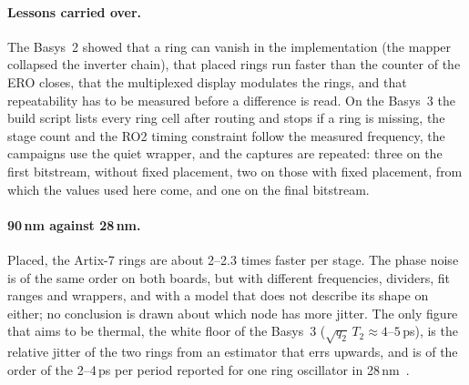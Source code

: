 \paragraph{Lessons carried over.} The Basys~2 showed that a ring can vanish
in the implementation (the mapper collapsed the inverter chain), that
placed rings run faster than the counter of the \ac{ERO} closes, that the
multiplexed display modulates the rings, and that repeatability has to be
measured before a difference is read. On the Basys~3 the build script lists
every ring cell after routing and stops if a ring is missing, the stage
count and the RO2 timing constraint follow the measured frequency, the
campaigns use the quiet wrapper, and the captures are repeated: three on
the first bitstream, without fixed placement, two on those with fixed
placement, from which the values used here come, and one on the final
bitstream.

\paragraph{90\,nm against 28\,nm.} Placed, the Artix-7 rings are about
2--2.3 times faster per stage. The phase noise is of the same order on
both boards, but with different frequencies, dividers, fit ranges and
wrappers, and with a model that does not describe its shape on either; no
conclusion is drawn about which node has more jitter. The only figure that
aims to be thermal, the white floor of the Basys~3
($\sqrt{q_2}\,T_2 \approx 4$--$5$\,ps), is the relative jitter of the two
rings from an estimator that errs upwards, and is of the order of the
2--4\,ps per period reported for one ring oscillator in
28\,nm~\cite{petura_2016_survey}.
